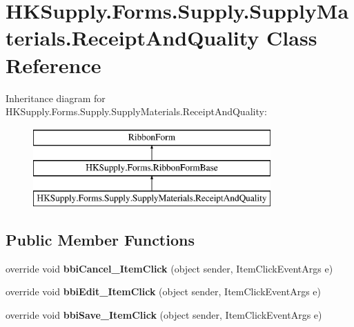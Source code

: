 \hypertarget{class_h_k_supply_1_1_forms_1_1_supply_1_1_supply_materials_1_1_receipt_and_quality}{}\section{H\+K\+Supply.\+Forms.\+Supply.\+Supply\+Materials.\+Receipt\+And\+Quality Class Reference}
\label{class_h_k_supply_1_1_forms_1_1_supply_1_1_supply_materials_1_1_receipt_and_quality}
Inheritance diagram for H\+K\+Supply.\+Forms.\+Supply.\+Supply\+Materials.\+Receipt\+And\+Quality\+:\begin{figure}[H]
\begin{center}
\leavevmode
\includegraphics[height=3.000000cm]{class_h_k_supply_1_1_forms_1_1_supply_1_1_supply_materials_1_1_receipt_and_quality}
\end{center}
\end{figure}
\subsection*{Public Member Functions}
\begin{DoxyCompactItemize}
\item 
\mbox{\label{class_h_k_supply_1_1_forms_1_1_supply_1_1_supply_materials_1_1_receipt_and_quality_afcfb35daf4f0d79f0a0883163ef4aaef}} 
override void {\bfseries bbi\+Cancel\+\_\+\+Item\+Click} (object sender, Item\+Click\+Event\+Args e)
\item 
\mbox{\label{class_h_k_supply_1_1_forms_1_1_supply_1_1_supply_materials_1_1_receipt_and_quality_a9b81a57f56ac02aa93813b05e07c4e0a}} 
override void {\bfseries bbi\+Edit\+\_\+\+Item\+Click} (object sender, Item\+Click\+Event\+Args e)
\item 
\mbox{\label{class_h_k_supply_1_1_forms_1_1_supply_1_1_supply_materials_1_1_receipt_and_quality_a325482a9502d8b87a9ddfa81ecf17acd}} 
override void {\bfseries bbi\+Save\+\_\+\+Item\+Click} (object sender, Item\+Click\+Event\+Args e)
\end{DoxyCompactItemize}
